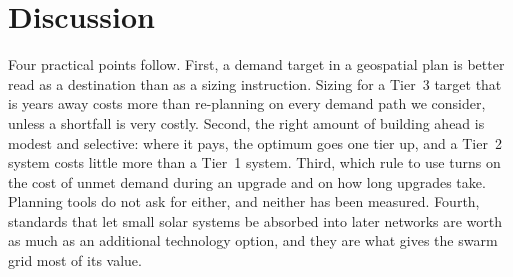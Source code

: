 \documentclass[11pt,a4paper]{article}
\begin{document}
\section{Discussion}
Four practical points follow. First, a demand target in a geospatial plan is better read as a destination than as
a sizing instruction. Sizing for a Tier~3 target that is years away costs more than re-planning on every demand
path we consider, unless a shortfall is very costly. Second, the right amount of building ahead is modest and
selective: where it pays, the optimum goes one tier up, and a Tier~2 system costs little more than a Tier~1
system. Third, which rule to use turns on the cost of unmet demand during an upgrade and on how long upgrades
take. Planning tools do not ask for either, and neither has been measured. Fourth, standards that let small solar
systems be absorbed into later networks are worth as much as an additional technology option, and they are what
gives the swarm grid most of its value.
\end{document}
